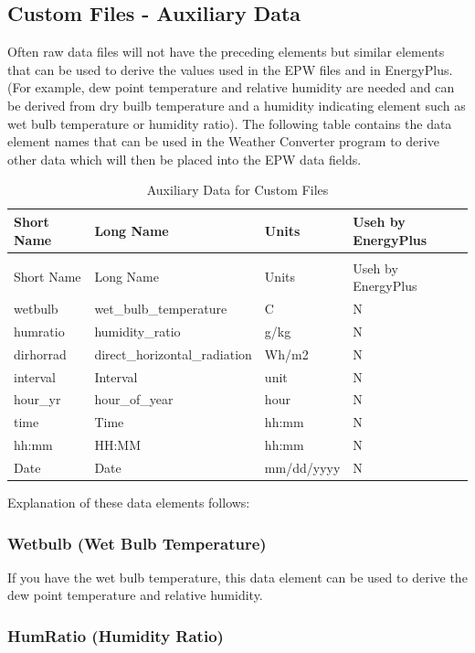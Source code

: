 \subsection{Custom Files - Auxiliary Data}\label{custom-files---auxiliary-data}

Often raw data files will not have the preceding elements but similar elements that can be used to derive the values used in the EPW files and in EnergyPlus. (For example, dew point temperature and relative humidity are needed and can be derived from dry builb temperature and a humidity indicating element such as wet bulb temperature or humidity ratio). The following table contains the data element names that can be used in the Weather Converter program to derive other data which will then be placed into the EPW data fields.

\begin{longtable}[c]{p{1.5in}p{1.5in}p{1.5in}p{1.5in}}
\caption{Auxiliary Data for Custom Files \label{table:auxiliary-data-for-custom-files}} \tabularnewline
\toprule 
Short Name & Long Name & Units & Useh by EnergyPlus \tabularnewline \midrule
\endfirsthead

\caption[]{Auxiliary Data for Custom Files} \tabularnewline
\toprule 
Short Name & Long Name & Units & Useh by EnergyPlus \tabularnewline \midrule
\endhead

wetbulb & wet\_bulb\_temperature & C & N \tabularnewline
humratio & humidity\_ratio & g/kg & N \tabularnewline
dirhorrad & direct\_horizontal\_radiation & Wh/m2 & N \tabularnewline
interval & Interval & unit & N \tabularnewline
hour\_yr & hour\_of\_year & hour & N \tabularnewline
time & Time & hh:mm & N \tabularnewline
hh:mm & HH:MM & hh:mm & N \tabularnewline
Date & Date & mm/dd/yyyy & N \tabularnewline
\bottomrule
\end{longtable}

Explanation of these data elements follows:

\subsubsection{Wetbulb (Wet Bulb Temperature)}\label{wetbulb-wet-bulb-temperature}

If you have the wet bulb temperature, this data element can be used to derive the dew point temperature and relative humidity.

\subsubsection{HumRatio (Humidity Ratio)}\label{humratio-humidity-ratio}

